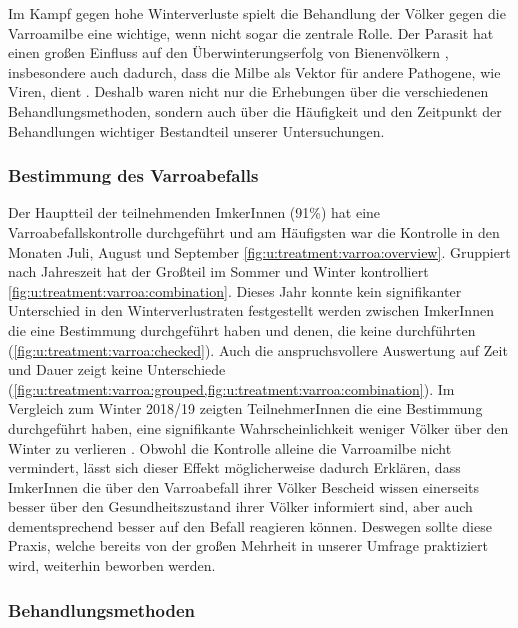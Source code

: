 Im Kampf gegen hohe Winterverluste spielt die Behandlung der Völker gegen die Varroamilbe eine wichtige, wenn nicht sogar die zentrale Rolle. Der Parasit hat einen großen Einfluss auf den Überwinterungserfolg von Bienenvölkern \citep{dahle2010}, insbesondere auch dadurch, dass die Milbe als Vektor für andere Pathogene, wie Viren, dient \citep{rosenkranz2010, noel2020}. Deshalb waren nicht nur die Erhebungen über die verschiedenen Behandlungsmethoden, sondern auch über die Häufigkeit und den Zeitpunkt der Behandlungen wichtiger Bestandteil unserer Untersuchungen.

\subsubsection{Bestimmung des Varroabefalls}

Der Hauptteil der teilnehmenden ImkerInnen (91\%) hat eine Varroabefalls\-kontrolle durchgeführt und am Häufigsten war die Kontrolle in den Monaten Juli, August und September \cref{fig:u:treatment:varroa:overview}. Gruppiert nach Jahreszeit hat der Großteil im Sommer und Winter kontrolliert \cref{fig:u:treatment:varroa:combination}. Dieses Jahr konnte kein signifikanter Unterschied in den Winterverlustraten festgestellt werden zwischen ImkerInnen die eine Bestimmung durchgeführt haben und denen, die keine durchführten (\cref{fig:u:treatment:varroa:checked}). Auch die anspruchsvollere Auswertung auf Zeit und Dauer zeigt keine Unterschiede (\cref{fig:u:treatment:varroa:grouped,fig:u:treatment:varroa:combination}). Im Vergleich zum Winter 2018/19 zeigten TeilnehmerInnen die eine Bestimmung durchgeführt haben, eine signifikante Wahrscheinlichkeit weniger Völker über den Winter zu verlieren \citep{oberreiter2020}. Obwohl die Kontrolle alleine die Varroamilbe nicht vermindert, lässt sich dieser Effekt möglicherweise dadurch Erklären, dass ImkerInnen die über den Varroabefall ihrer Völker Bescheid wissen einerseits besser über den Gesundheitszustand ihrer Völker informiert sind, aber auch dementsprechend besser auf den Befall reagieren können. Deswegen sollte diese Praxis, welche bereits von der großen Mehrheit in unserer Umfrage praktiziert wird, weiterhin beworben werden.

\subsubsection{Behandlungsmethoden}

